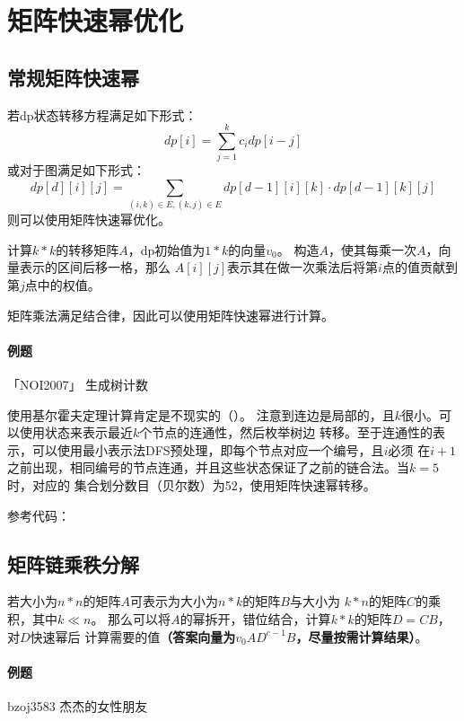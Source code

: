 \section{矩阵快速幂优化}
\subsection{常规矩阵快速幂}
若dp状态转移方程满足如下形式：
\begin{displaymath}
    dp[i]=\sum_{j=1}^k{c_idp[i-j]}
\end{displaymath}
或对于图满足如下形式：
\begin{displaymath}
    dp[d][i][j]=\sum_{(i,k)\in E,(k,j)\in E}{dp[d-1][i][k]\cdot dp[d-1][k][j]}
\end{displaymath}
则可以使用矩阵快速幂优化。

计算$k*k$的转移矩阵$A$，dp初始值为$1*k$的向量$v_0$。
构造$A$，使其每乘一次$A$，向量表示的区间后移一格，那么
$A[i][j]$表示其在做一次乘法后将第$i$点的值贡献到第$j$点中的权值。

矩阵乘法满足结合律，因此可以使用矩阵快速幂进行计算。

\paragraph{例题} 「NOI2007」 生成树计数

使用基尔霍夫定理计算肯定是不现实的（）。
注意到连边是局部的，且$k$很小。可以使用状态来表示最近$k$个节点的连通性，然后枚举树边
转移。至于连通性的表示，可以使用最小表示法DFS预处理，即每个节点对应一个编号，且$i$必须
在$i+1$之前出现，相同编号的节点连通，并且这些状态保证了之前的链合法。当$k=5$时，对应的
集合划分数目（贝尔数）为52，使用矩阵快速幂转移。

参考代码：


\subsection{矩阵链乘秩分解}

若大小为$n*n$的矩阵$A$可表示为大小为$n*k$的矩阵$B$与大小为
$k*n$的矩阵$C$的乘积，其中$k\ll n$。
那么可以将$A$的幂拆开，错位结合，计算$k*k$的矩阵$D=CB$，对$D$快速幂后
计算需要的值{\bfseries （答案向量为$v_0AD^{c-1}B$，尽量按需计算结果）}。

\paragraph{例题} bzoj3583 杰杰的女性朋友

